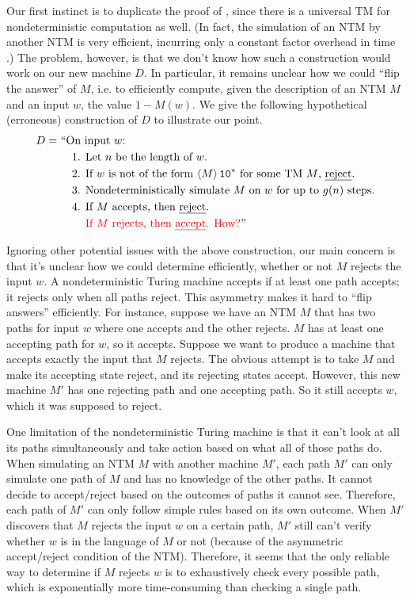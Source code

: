 \documentclass[11pt,twoside=off,numbers=noenddot]{scrbook}
\begin{document}
Our first instinct is to duplicate the proof of , since there is a universal TM for nondeterministic computation as well. (In fact, the simulation of an NTM by another NTM is very efficient, incurring only a constant factor overhead in time \cite{arora2009computational}.) The problem, however, is that we don't know how such a construction would work on our new machine $D$. In particular, it remains unclear how we could ``flip the answer'' of $M$, i.e. to efficiently compute, given the description of an NTM $M$ and an input $w$, the value $1 - M(w)$. We give the following hypothetical (erroneous) construction of $D$ to illustrate our point.
\begin{align*}
  D = & \ \text{``On input $w$:} \\
  & \ \quad \text{1. } \text{Let $n$ be the length of $w$.} \\
  & \ \quad \text{2. } \text{If $w$ is not of the form $\enc{M}\texttt{1}\texttt{0}^\ast$ for some TM $M$, \emph{reject}.} \\
  & \ \quad \text{3. } \text{Nondeterministically simulate $M$ on $w$ for up to $g(n)$ steps.} \\
  & \ \quad \text{4. } \text{If $M$ accepts, then \emph{reject}.} \\
  & \ \quad \phantom{\text{4. }} \text{\incorrect{If $M$ rejects, then \emph{accept}. How?}''}
\end{align*}

Ignoring other potential issues with the above construction, our main concern is that it's unclear how we could determine efficiently, whether or not $M$ rejects the input $w$. A nondeterministic Turing machine accepts if at least one path accepts; it rejects only when all paths reject. This asymmetry makes it hard to ``flip answers'' efficiently. For instance, suppose we have an NTM $M$ that has two paths for input $w$ where one accepts and the other rejects. $M$ has at least one accepting path for $w$, so it accepts. Suppose we want to produce a machine that accepts exactly the input that $M$ rejects. The obvious attempt is to take $M$ and make its accepting state reject, and its rejecting states accept. However, this new machine $M'$ has one rejecting path and one accepting path. So it still accepts $w$, which it was supposed to reject.

One limitation of the nondeterministic Turing machine is that it can't look at all its paths simultaneously and take action based on what all of those paths do. When simulating an NTM $M$ with another machine $M'$, each path $M'$ can only simulate one path of $M$ and has no knowledge of the other paths. It cannot decide to accept/reject based on the outcomes of paths it cannot see. Therefore, each path of $M'$ can only follow simple rules based on its own outcome. When $M'$ discovers that $M$ rejects the input $w$ on a certain path, $M'$ still can't verify whether $w$ is in the language of $M$ or not (because of the asymmetric accept/reject condition of the NTM). Therefore, it seems that the only reliable way to determine if $M$ rejects $w$ is to exhaustively check every possible path, which is exponentially more time-consuming than checking a single path.
\end{document}

